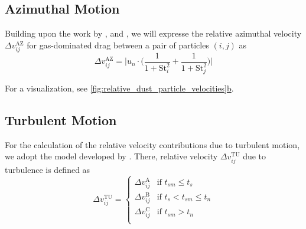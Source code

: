     \subsection{Azimuthal Motion}

        Building upon the work by \cite{birnstiel_dullemond_brauer_2010}, 
        \cite{weidenschilling_1977} and \cite{nakagawa_1986}, we will expresse the relative 
        azimuthal velocity $\Delta v^\text{AZ}_{ij}$ for gas-dominated drag between a pair of 
        particles $(i, j)$ as
        \begin{equation}
            \Delta v^\text{AZ}_{ij}=\bigg|
                u_n\cdot\bigg(
                    \frac{1}{1+\text{St}_i^2}+
                    \frac{1}{1+\text{St}_j^2}
                \bigg)
            \bigg|
        \end{equation}

    
        For a visualization, see \hyperref[fig:relative_dust_particle_velocities]
        {\cref*{fig:relative_dust_particle_velocities}b}.

    \subsection{Turbulent Motion}

        For the calculation of the relative velocity contributions due to turbulent motion, we 
        adopt the model developed by \cite{ormel_cuzzi_2007}.
        There, relative velocity $\Delta v^\text{TU}_{ij}$ due to turbulence is defined as
        \begin{equation}
            \Delta v^\text{TU}_{ij} =
            \begin{cases}
                \Delta v_{ij}^\text{A} & \text{if } t_{sm} \leq t_s \\
                \Delta v_{ij}^\text{B} & \text{if } t_s < t_{sm} \leq t_n \\
                \Delta v_{ij}^\text{C} & \text{if } t_{sm} > t_n \\
            \end{cases}
        \end{equation}

